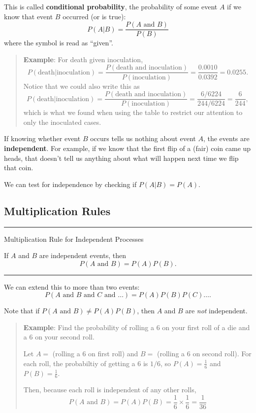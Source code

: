 \documentclass[
]{book}
\begin{document}
This is called \textbf{conditional probability}, the probability of some event \(A\) if we know that event \(B\) occurred (or is true): \[P(A|B) = \frac{P(A\text{ and }B)}{P(B)}\] where the symbol \textbar{} is read as ``given''.

\begin{quote}
\textbf{Example}: For death given inoculation, \[P(\text{death}|\text{inoculation}) = \frac{P(\text{death and inoculation})}{P(\text{inoculation})} = \frac{0.0010}{0.0392} = 0.0255.\]
Notice that we could also write this as \[P(\text{death}|\text{inoculation}) = \frac{P(\text{death and inoculation})}{P(\text{inoculation})} = \frac{6/6224}{244/6224} = \frac{6}{244},\] which is what we found when using the table to restrict our attention to only the inoculated cases.
\end{quote}

If knowing whether event \(B\) occurs tells us nothing about event \(A\), the events are \textbf{independent}. For example, if we know that the first flip of a (fair) coin came up heads, that doesn't tell us anything about what will happen next time we flip that coin.

We can test for independence by checking if \(P(A|B)=P(A)\).

\subsection{Multiplication Rules}\label{multiplication-rules}

\begin{center}\rule{0.5\linewidth}{0.5pt}\end{center}

Multiplication Rule for Independent Processes

If \(A\) and \(B\) are independent events, then \[P(A \text{ and }B) = P(A)P(B).\]

\begin{center}\rule{0.5\linewidth}{0.5pt}\end{center}

We can extend this to more than two events: \[P(A \text{ and }B \text{ and } C \text{ and } \dots) = P(A)P(B)P(C)\dots.\]

Note that if \(P(A \text{ and }B) \ne P(A)P(B)\), then \(A\) and \(B\) are \emph{not} independent.

\begin{quote}
\textbf{Example}: Find the probability of rolling a \(6\) on your first roll of a die and a \(6\) on your second roll.

Let \(A=\) (rolling a \(6\) on first roll) and \(B=\) (rolling a \(6\) on second roll). For each roll, the probabiltiy of getting a \(6\) is \(1/6\), so \(P(A) = \frac{1}{6}\) and \(P(B)  = \frac{1}{6}\).

Then, because each roll is independent of any other rolls, \[P(A \text{ and }B) = P(A)P(B) = \frac{1}{6}\times\frac{1}{6} = \frac{1}{36}\]
\end{quote}
\end{document}
